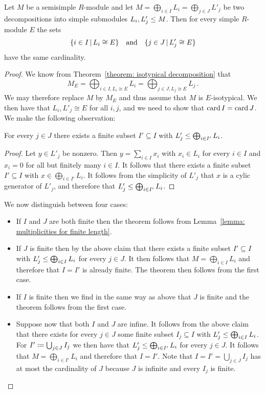 \begin{theorem}
  \label{theorem: multiplicity well-defined}
  Let $M$ be a semisimple $R$-module and let $M = \bigoplus_{i \in I} L_i = \bigoplus_{j \in J} L'_j$ be two decompositions into simple submodules $L_i, L'_j \leq M$.
  Then for every simple $R$-module $E$ the sets
  \[
    \{ i \in I \suchthat L_i \cong E \}
    \quad\text{and}\quad
    \{ j \in J \suchthat L'_j \cong E \}
  \]
  have the same cardinality.
\end{theorem}


\begin{proof}
  We know from Theorem~\ref{theorem: isotypical decomposition} that
  \[
      M_E
    = \bigoplus_{i \in I, L_i \cong E} L_i
    = \bigoplus_{j \in J, L_j \cong E} L_j \,.
  \]
  We may therefore replace $M$ by $M_E$ and thus assume that $M$ is $E$-isotypical.
  We then have that $L_i, L'_j \cong E$ for all $i, j$, and we need to show that $\operatorname{card}{I} = \operatorname{card}{J}$.
  We make the following observation:
  
  \begin{claim}
    For every $j \in J$ there exists a finite subset $I' \subseteq I$ with $L'_j \leq \bigoplus_{i \in I'} L_i$.
  \end{claim}
  
  \begin{proof}
    Let $y \in L'_j$ be nonzero.
    Then $y = \sum_{i \in I} x_i$ with $x_i \in L_i$ for every $i \in I$ and $x_i = 0$ for all but finitely many $i \in I$.
    It follows that there exists a finite subset $I' \subseteq I$ with $x \in \bigoplus_{i \in I'} L_i$.
    It follows from the simplicity of $L'_j$ that $x$ is a cylic generator of $L'_j$, and therefore that $L'_j \leq \bigoplus_{i \in I'} L_i$.
  \end{proof}
  
  We now distinguish between four cases:
  \begin{itemize}
    \item 
      If $I$ and $J$ are both finite then the theorem follows from Lemma~\ref{lemma: multiplicities for finite length}.
    \item
      If $J$ is finite then by the above claim that there exists a finite subset $I' \subseteq I$ with $L'_j \leq \bigoplus_{i \in I} L_i$ for every $j \in J$.
      It then follows that $M = \bigoplus_{i \in I} L_i$ and therefore that $I = I'$ is already finite.
      The theorem then follows from the first case.
    \item
      If $I$ is finite then we find in the same way as above that $J$ is finite and the theorem follows from the first case.
    \item
      Suppose now that both $I$ and $J$ are infine.
      It follows from the above claim that there exists for every $j \in J$ some finite subset $I_j \subseteq I$ with $L'_j \leq \bigoplus_{i \in I} L_i$.
      For $I' \coloneqq \bigcup_{j \in J} I_j$ we then have that $L'_j \leq \bigoplus_{i \in I'} L_i$ for every $j \in J$.
      It follows that $M = \bigoplus_{i \in I'} L_i$ and therefore that $I = I'$.
      Note that $I = I' = \bigcup_{j \in J} I_j$ has at most the cardinality of $J$ because $J$ is infinite and every $I_j$ is finite.
      

\end{itemize}
\end{proof}
